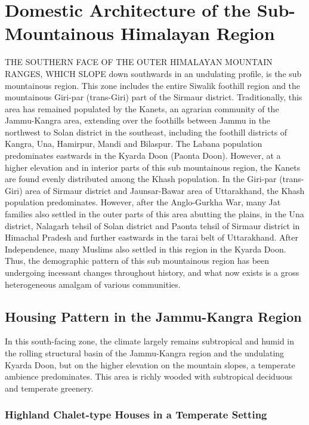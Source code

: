 
\chapter{Domestic Architecture of the Sub-Mountainous Himalayan Region}\label{chap02}

THE SOUTHERN FACE OF THE OUTER HIMALAYAN MOUNTAIN RANGES, WHICH SLOPE down southwards in an undulating profile, is the sub mountainous region. This zone includes the entire Siwalik foothill region and the mountainous Giri-par (trans-Giri) part of the Sirmaur district. Traditionally, this area has remained populated by the Kanets, an agrarian community of the Jammu-Kangra area, extending over the foothills between Jammu in the northwest to Solan district in the southeast, including the foothill districts of Kangra, Una, Hamirpur, Mandi and Bilaspur. The Labana population predominates eastwards in the Kyarda Doon (Paonta Doon). However, at a higher elevation and in interior parts of this sub mountainous region, the Kanets are found evenly distributed among the Khash population. In the Giri-par (trans-Giri) area of Sirmaur district and Jaunsar-Bawar area of Uttarakhand, the Khash population predominates. However, after the Anglo-Gurkha War, many Jat families also settled in the outer parts of this area abutting the plains, in the Una district, Nalagarh tehsil of Solan district and Paonta tehsil of Sirmaur district in Himachal Pradesh and further eastwards in the tarai belt of Uttarakhand. After Independence, many Muslims also settled in this region in the Kyarda Doon. Thus, the demographic pattern of this sub mountainous region has been undergoing incessant changes throughout history, and what now exists is a gross heterogeneous amalgam of various communities.

\section*{Housing Pattern in the Jammu-Kangra Region}

In this south-facing zone, the climate largely remains subtropical and humid in the rolling structural basin of the Jammu-Kangra region and the undulating Kyarda Doon, but on the higher elevation on the mountain slopes, a temperate ambience predominates. This area is richly wooded with subtropical deciduous and temperate greenery.

\subsection*{Highland Chalet-type Houses in a Temperate Setting}

